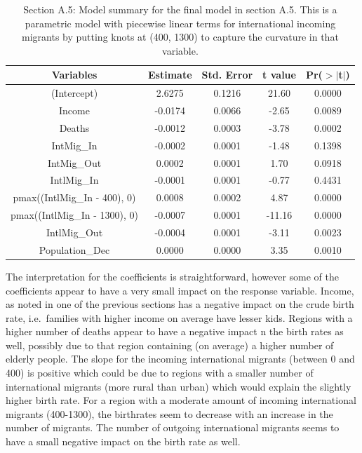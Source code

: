 \documentclass[paper=a4, fontsize=11pt]{scrartcl} %
\numberwithin{equation}{section} %
\begin{document}
\begin{table}[ht]
\centering
\begin{tabular}{ccccc}
  \hline
 Variables & Estimate & Std. Error & t value & Pr($>|$t$|$) \\ 
  \hline
(Intercept) & 2.6275 & 0.1216 & 21.60 & 0.0000 \\ 
  Income & -0.0174 & 0.0066 & -2.65 & 0.0089 \\ 
  Deaths & -0.0012 & 0.0003 & -3.78 & 0.0002 \\ 
  IntMig\_In & -0.0002 & 0.0001 & -1.48 & 0.1398 \\ 
  IntMig\_Out & 0.0002 & 0.0001 & 1.70 & 0.0918 \\ 
  IntlMig\_In & -0.0001 & 0.0001 & -0.77 & 0.4431 \\ 
  pmax((IntlMig\_In - 400), 0) & 0.0008 & 0.0002 & 4.87 & 0.0000 \\ 
  pmax((IntlMig\_In - 1300), 0) & -0.0007 & 0.0001 & -11.16 & 0.0000 \\ 
  IntlMig\_Out & -0.0004 & 0.0001 & -3.11 & 0.0023 \\ 
  Population\_Dec & 0.0000 & 0.0000 & 3.35 & 0.0010 \\ 
   \hline
\end{tabular}
\caption{Section A.5: Model summary for the final model in section A.5. This is a parametric model with piecewise linear terms for international incoming migrants by putting knots at (400, 1300) to capture the curvature in that variable.}
\label{final-coeff}
\end{table}

The interpretation for the coefficients is straightforward, however some of the coefficients appear to have a very small impact on the response variable. Income, as noted in one of the previous sections has a negative impact on the crude birth rate, i.e.\ families with higher income on average have lesser kids. Regions with a higher number of deaths appear to have a negative impact n the birth rates as well, possibly due to that region containing (on average) a higher number of elderly people. The slope for the incoming international migrants (between 0 and 400) is positive which could be due to regions with a smaller number of international migrants (more rural than urban) which would explain the slightly higher birth rate. For a region with a moderate amount of incoming international migrants (400-1300), the birthrates seem to decrease with an increase in the number of migrants. The number of outgoing international migrants seems to have a small negative impact on the birth rate as well. 
\end{document}
